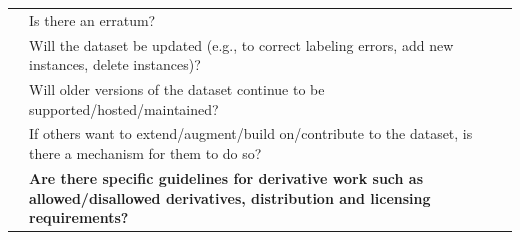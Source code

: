 \documentclass[journal]{IEEEtran}
\begin{document}
\begin{table}[]
\begin{tabular}{|p{}|p{}|}
                                                 & Is there an erratum?                                                                                                                                                                                                      \\
                                                 & Will the dataset be updated (e.g., to correct labeling errors, add new instances, delete instances)?                                                                                                                      \\
                                                 & Will older versions of the dataset continue to be supported/hosted/maintained?                                                                                                                                            \\
                                                 & If others want to extend/augment/build on/contribute to the dataset, is there a mechanism for them to do so?                                                                                                              \\
                                                 & \textbf{Are there specific guidelines for derivative work such as allowed/disallowed derivatives, distribution and licensing requirements?}                                                                               \\ \hline
\end{tabular}
\end{table}

\end{document}
